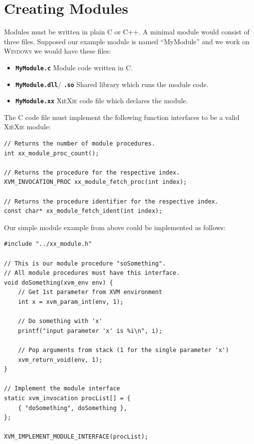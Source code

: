 \documentclass{report}
\def\xiexie{\textsc{Xi\`eXie}\xspace}
\def\cpp{\textsc{C++}\xspace}
\def\windows{\textsc{Windows}\xspace}
\begin{document}

\section{Creating Modules}

Modules must be written in plain C or \cpp. A minimal module would consist of three files.
Supposed our example module is named ``MyModule'' and we work on \windows we would have these files:
\begin{itemize}
	\item \textbf{\texttt{MyModule.c}} Module code written in C.
	\item \textbf{\texttt{MyModule.dll}}/ \textbf{\texttt{.so}} Shared library which runs the module code.
	\item \textbf{\texttt{MyModule.xx}} \xiexie code file which declares the module. 
\end{itemize}
The C code file must implement the following function interfaces to be a valid \xiexie module:
\begin{lstlisting}
// Returns the number of module procedures.
int xx_module_proc_count();

// Returns the procedure for the respective index.
XVM_INVOCATION_PROC xx_module_fetch_proc(int index);

// Returns the procedure identifier for the respective index.
const char* xx_module_fetch_ident(int index);
\end{lstlisting}
Our simple module example from above could be implemented as follows:
\begin{lstlisting}
#include "../xx_module.h"

// This is our module procedure "soSomething".
// All module procedures must have this interface.
void doSomething(xvm_env env) {
    // Get 1st parameter from XVM environment
    int x = xvm_param_int(env, 1);
    
    // Do something with 'x'
    printf("input parameter 'x' is %i\n", i);
    
    // Pop arguments from stack (1 for the single parameter 'x')
    xvm_return_void(env, 1);
}

// Implement the module interface
static xvm_invocation procList[] = {
    { "doSomething", doSomething },
};

XVM_IMPLEMENT_MODULE_INTERFACE(procList);
\end{lstlisting}
\end{document}
